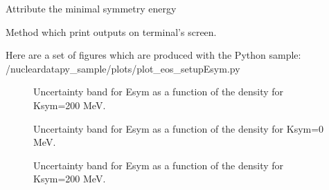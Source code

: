 \documentclass[letterpaper,10pt,english]{sphinxmanual}
\begin{document}
\begin{fulllineitems}
\begin{fulllineitems}
\label{\detokenize{source/api/setup_eos_esym:nucleardatapy.eos.setup_esym.setupEsym.esym_e2a_min}}
\pysigstartsignatures
{}
\pysigstopsignatures
\sphinxAtStartPar
Attribute the minimal symmetry energy

\end{fulllineitems}


\begin{fulllineitems}
\label{\detokenize{source/api/setup_eos_esym:nucleardatapy.eos.setup_esym.setupEsym.print_outputs}}
\pysigstartsignatures
{}
\pysigstopsignatures
\sphinxAtStartPar
Method which print outputs on terminal’s screen.

\end{fulllineitems}


\end{fulllineitems}


\sphinxAtStartPar
Here are a set of figures which are produced with the Python sample: /nucleardatapy\_sample/plots/plot\_eos\_setupEsym.py

\begin{figure}[htbp]
\centering
\capstart

\noindent{}
\caption{Uncertainty band for Esym as a function of the density for Ksym=\sphinxhyphen{}200 MeV.}\label{\detokenize{source/api/setup_eos_esym:id1}}\end{figure}

\begin{figure}[htbp]
\centering
\capstart

\noindent{}
\caption{Uncertainty band for Esym as a function of the density for Ksym=0 MeV.}\label{\detokenize{source/api/setup_eos_esym:id2}}\end{figure}

\begin{figure}[htbp]
\centering
\capstart

\noindent{}
\caption{Uncertainty band for Esym as a function of the density for Ksym=200 MeV.}\label{\detokenize{source/api/setup_eos_esym:id3}}\end{figure}
\end{document}
